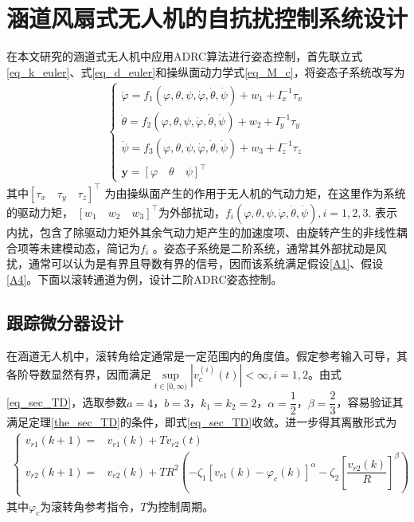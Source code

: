 \section{涵道风扇式无人机的自抗扰控制系统设计}
在本文研究的涵道式无人机中应用ADRC算法进行姿态控制，首先联立式\eqref{eq_k_euler}、式\eqref{eq_d_euler}和操纵面动力学式\eqref{eq_M_c}，将姿态子系统改写为
\begin{align}
\left\{\begin{array}{l}
\ddot{\varphi}=f_{1}( \varphi, \theta, \psi, \dot{\varphi}, \dot{\theta}, \dot{\psi}) +w_{1}+I_{x}^{-1} \tau_{x} \\
\ddot{\theta}=f_{2}(\varphi, \theta, \psi, \dot{\varphi}, \dot{\theta}, \dot{\psi})+w_{2}+I_{y}^{-1} \tau_{y} \\
\ddot{\psi}=f_{3}(\varphi, \theta, \psi, \dot{\varphi}, \dot{\theta}, \dot{\psi})+w_{3}+I_{z}^{-1} \tau_{z} \\
\bm{y}=[\varphi \quad \theta \quad \psi]^\top
\end{array}\right.	\label{eq_attitude_sys}
\end{align}
其中$ [\tau_{x} \quad \tau_{y} \quad \tau_{z}] ^\top $ 为由操纵面产生的作用于无人机的气动力矩，在这里作为系统的驱动力矩， $  [w_{1} \quad w_{2} \quad w_{3}]^\top $为外部扰动，$f_{i}( \varphi, \theta, \psi, \dot{\varphi}, \dot{\theta}, \dot{\psi}),i=1,2,3. $ 表示内扰，包含了除驱动力矩外其余气动力矩产生的加速度项、由旋转产生的非线性耦合项等未建模动态，简记为$ f_{i} $ 。姿态子系统是二阶系统，通常其外部扰动是风扰，通常可以认为是有界且导数有界的信号，因而该系统满足假设\ref{A1}、假设\ref{A4}。下面以滚转通道为例，设计二阶ADRC姿态控制。
\subsection{跟踪微分器设计}
在涵道无人机中，滚转角给定通常是一定范围内的角度值。假定参考输入可导，其各阶导数显然有界，因而满足$ \sup\limits_{t \in[0, \infty ) }\left|v^{(i)}_c(t)\right|<\infty, i=1,2$。由式\eqref{eq_sec_TD}，选取参数$a=4$，$b=3$，$ k_{1}=k_{2}=2$，$\alpha=\dfrac{1}{2}$，$ \beta=\dfrac{2}{3}$，容易验证其满足定理\ref{the_sec_TD}的条件，即式\eqref{eq_sec_TD}收敛。进一步得其离散形式为
\begin{align}
{\left\{\begin{aligned}
	v_{r1}(k+1)=&  v_{r1}(k) +T v_{r2}(t) \\
	v_{r2}(k+1)=& v_{r2}(k) + TR^{2}\left(-\zeta_{1}\left[v_{r1}(k)-\varphi_c(k)\right]^{\alpha}-\zeta_{2}\left[\dfrac{v_{r2}(k)}{R}\right]^{\beta}\right)
	\end{aligned}\right.}	\label{eq_roll_TD}	
\end{align}
其中$ \varphi_c $为滚转角参考指令，$ T $为控制周期。
